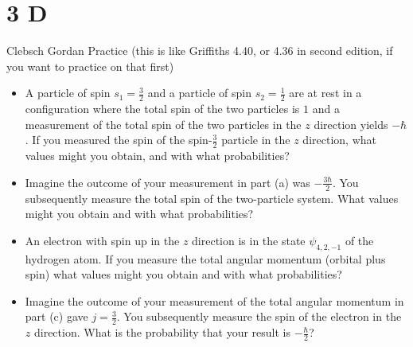 \documentclass{article}
\begin{document}
\section*{3 D}
\begin{ques}\label{q3}
Clebsch Gordan Practice (this is like Griffiths 4.40, or 4.36 in second edition, if you want to practice on that first)
\begin{itemize}
\item[(a)] A particle of spin \( s_1 = \frac{3}{2} \) and a particle of spin \( s_2 = \frac{1}{2} \) are at rest in a configuration where the total spin of the two particles is \( 1 \) and a measurement of the total spin of the two particles in the \( z \) direction yields \( -\hbar \). If you measured the spin of the spin-\( \frac{3}{2} \) particle in the \( z \) direction, what values might you obtain, and with what probabilities?

\item[(b)] Imagine the outcome of your measurement in part (a) was \( -\frac{3\hbar}{2} \). You subsequently measure the total spin of the two-particle system. What values might you obtain and with what probabilities?

\item[(c)] An electron with spin up in the \( z \) direction is in the state \( \psi_{4,2,-1} \) of the hydrogen atom. If you measure the total angular momentum (orbital plus spin) what values might you obtain and with what probabilities?

\item[(d)] Imagine the outcome of your measurement of the total angular momentum in part (c) gave \( j = \frac{3}{2} \). You subsequently measure the spin of the electron in the \( z \) direction. What is the probability that your result is \( -\frac{\hbar}{2} \)?
\end{itemize}
\end{ques}
\end{document}
